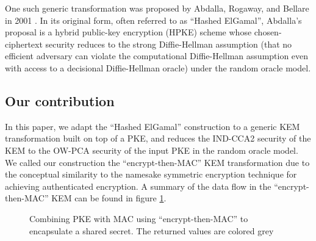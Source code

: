 \documentclass[journal=tches,submission]{iacrtrans}
\newcommand{\mac}{\texttt{MAC}}
\newcommand{\pk}{\texttt{pk}}
\newcommand{\leftsample}{\stackrel{\$}{\leftarrow}}
\begin{document}
One such generic transformation was proposed by Abdalla, Rogaway, and Bellare in 2001 \cite{DBLP:conf/ctrsa/AbdallaBR01}. In its original form, often referred to as ``Hashed ElGamal'', Abdalla's proposal is a hybrid public-key encryption (HPKE) scheme whose chosen-ciphertext security reduces to the strong Diffie-Hellman assumption (that no efficient adversary can violate the computational Diffie-Hellman assumption even with access to a decisional Diffie-Hellman oracle) under the random oracle model. 

\subsection{Our contribution}

In this paper, we adapt the ``Hashed ElGamal'' construction to a generic KEM transformation built on top of a PKE, and reduces the IND-CCA2 security of the KEM to the OW-PCA security of the input PKE in the random oracle model. We called our construction the ``encrypt-then-MAC'' KEM transformation due to the conceptual similarity to the namesake symmetric encryption technique for achieving authenticated encryption. A summary of the data flow in the ``encrypt-then-MAC'' KEM can be found in figure \ref{fig:etm-diagram}.

\begin{figure}
    \centering

    \caption{Combining PKE with MAC using ``encrypt-then-MAC'' to encapsulate a shared secret. 
    The returned values are colored grey
    }\label{fig:etm-diagram}
\end{figure}
\end{document}
